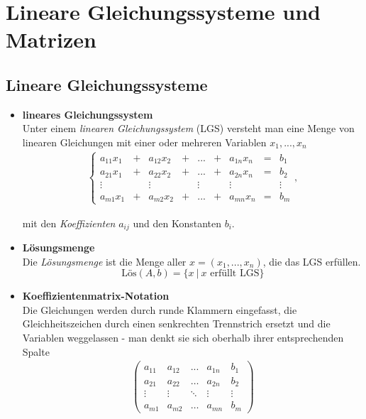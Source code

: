 \documentclass{article}
\begin{document}
\newpage


\section{Lineare Gleichungssysteme und Matrizen}
\subsection{Lineare Gleichungssysteme}
	\begin{itemize}
		\item \textbf{lineares Gleichungssystem}\\
		Unter einem \textit{linearen Gleichungssystem} (LGS) versteht man eine Menge von linearen Gleichungen mit einer oder mehreren Variablen $x_1, ..., x_n$
			\begin{align}
				\left\{
				\begin{array}{cccccccccc}
						a_{11}x_1 &+& a_{12}x_2 &+& ... &+& a_{1n}x_n &=& b_1 \\
						a_{21}x_1 &+& a_{22}x_2 &+& ... &+& a_{2n}x_n &=& b_2 \\
						\vdots & & \vdots & & \vdots & & \vdots & & \vdots \\
						a_{m1}x_1 &+& a_{m2}x_2 &+& ... &+& a_{mn}x_n &=& b_m
				\end{array}
				\right.,
			\end{align}
		
		mit den \textit{Koeffizienten} $a_{ij}$ und den Konstanten $b_i$.


		\item \textbf{Lösungsmenge}\\
		Die \textit{Lösungsmenge} ist die Menge aller $x = (x_1, ..., x_n)$, die das LGS erfüllen.
			\begin{equation}
				\text{Lös}(A,b) = \{x\ |\ \text{$x$ erfüllt LGS}\}
			\end{equation}
	\end{itemize}


	\begin{itemize}
		\item \textbf{Koeffizientenmatrix-Notation}\\
		Die Gleichungen werden durch runde Klammern eingefasst, die Gleichheitszeichen durch einen senkrechten Trennstrich ersetzt und die Variablen weggelassen - man denkt sie sich oberhalb ihrer entsprechenden Spalte
			\begin{align}
				\left(\begin{array}{cccc|c}
					a_{11} & a_{12} & ... & a_{1n} & b_1\\
					a_{21} & a_{22} & \dots & a_{2n} & b_2\\
					\vdots & \vdots & \ddots & \vdots & \vdots\\
					a_{m1} & a_{m2} & \dots & a_{mn} & b_m
				\end{array}\right)
			\end{align}
	\end{itemize}
\end{document}
